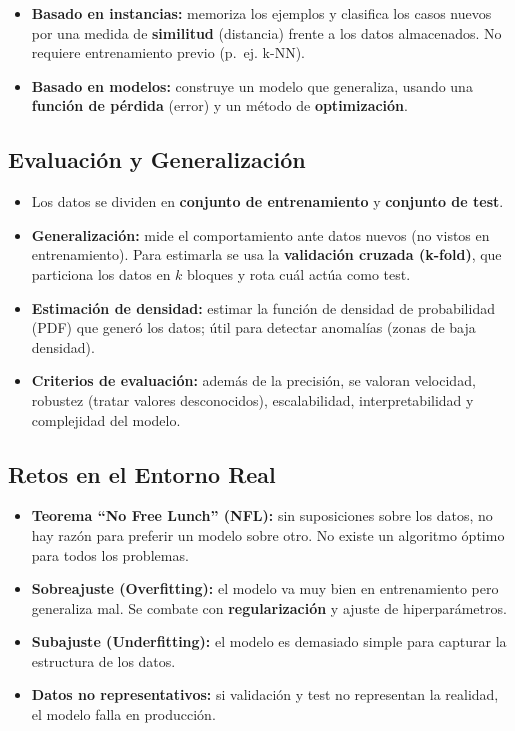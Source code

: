 \documentclass[12pt]{book} %
\providecommand{\tightlist}{%
  \setlength{\itemsep}{0pt}\setlength{\parskip}{0pt}}
\begin{document}
\begin{itemize}
\tightlist
\item
  \textbf{Basado en instancias:} memoriza los ejemplos y clasifica los
  casos nuevos por una medida de \textbf{similitud} (distancia) frente a
  los datos almacenados. No requiere entrenamiento previo (p.~ej. k-NN).
\item
  \textbf{Basado en modelos:} construye un modelo que generaliza, usando
  una \textbf{función de pérdida} (error) y un método de
  \textbf{optimización}.
\end{itemize}

\hypertarget{evaluaciuxf3n-y-generalizaciuxf3n}{%
\subsection{Evaluación y
Generalización}\label{evaluaciuxf3n-y-generalizaciuxf3n}}

\begin{itemize}
\tightlist
\item
  Los datos se dividen en \textbf{conjunto de entrenamiento} y
  \textbf{conjunto de test}.
\item
  \textbf{Generalización:} mide el comportamiento ante datos nuevos (no
  vistos en entrenamiento). Para estimarla se usa la \textbf{validación
  cruzada (k-fold)}, que particiona los datos en \(k\) bloques y rota
  cuál actúa como test.
\item
  \textbf{Estimación de densidad:} estimar la función de densidad de
  probabilidad (PDF) que generó los datos; útil para detectar anomalías
  (zonas de baja densidad).
\item
  \textbf{Criterios de evaluación:} además de la precisión, se valoran
  velocidad, robustez (tratar valores desconocidos), escalabilidad,
  interpretabilidad y complejidad del modelo.
\end{itemize}

\hypertarget{retos-en-el-entorno-real}{%
\subsection{Retos en el Entorno Real}\label{retos-en-el-entorno-real}}

\begin{itemize}
\tightlist
\item
  \textbf{Teorema ``No Free Lunch'' (NFL):} sin suposiciones sobre los
  datos, no hay razón para preferir un modelo sobre otro. No existe un
  algoritmo óptimo para todos los problemas.
\item
  \textbf{Sobreajuste (Overfitting):} el modelo va muy bien en
  entrenamiento pero generaliza mal. Se combate con
  \textbf{regularización} y ajuste de hiperparámetros.
\item
  \textbf{Subajuste (Underfitting):} el modelo es demasiado simple para
  capturar la estructura de los datos.
\item
  \textbf{Datos no representativos:} si validación y test no representan
  la realidad, el modelo falla en producción.
\end{itemize}
\end{document}
